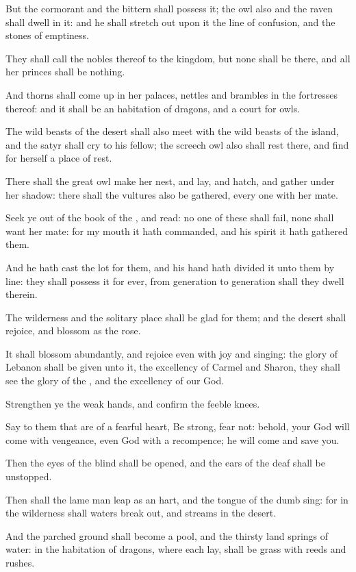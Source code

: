 \Verse But the cormorant and the bittern shall possess it; the owl also and the raven shall dwell in it: and he shall stretch out upon it the line of confusion, and the stones of emptiness.

\Verse They shall call the nobles thereof to the kingdom, but none shall be there, and all her princes shall be nothing.

\Verse And thorns shall come up in her palaces, nettles and brambles in the fortresses thereof: and it shall be an habitation of dragons, and a court for owls.

\Verse The wild beasts of the desert shall also meet with the wild beasts of the island, and the satyr shall cry to his fellow; the screech owl also shall rest there, and find for herself a place of rest.

\Verse There shall the great owl make her nest, and lay, and hatch, and gather under her shadow: there shall the vultures also be gathered, every one with her mate.

\Verse Seek ye out of the book of the \LORD, and read: no one of these shall fail, none shall want her mate: for my mouth it hath commanded, and his spirit it hath gathered them.

\Verse And he hath cast the lot for them, and his hand hath divided it unto them by line: they shall possess it for ever, from generation to generation shall they dwell therein.


\Chapter
\Verse The wilderness and the solitary place shall be glad for them; and the desert shall rejoice, and blossom as the rose.

\Verse It shall blossom abundantly, and rejoice even with joy and singing: the glory of Lebanon shall be given unto it, the excellency of Carmel and Sharon, they shall see the glory of the \LORD, and the excellency of our God.

\Verse Strengthen ye the weak hands, and confirm the feeble knees.

\Verse Say to them that are of a fearful heart, Be strong, fear not: behold, your God will come with vengeance, even God with a recompence; he will come and save you.

\Verse Then the eyes of the blind shall be opened, and the ears of the deaf shall be unstopped.

\Verse Then shall the lame man leap as an hart, and the tongue of the dumb sing: for in the wilderness shall waters break out, and streams in the desert.

\Verse And the parched ground shall become a pool, and the thirsty land springs of water: in the habitation of dragons, where each lay, shall be grass with reeds and rushes.

